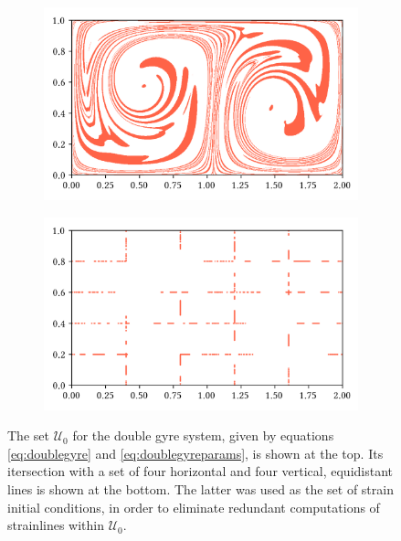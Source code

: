 \begin{figure}[htpb]
    \centering
    \begin{subfigure}{\textwidth}
        \centering
        \includegraphics{figures/domain_figures/u0_dom.png}
    \end{subfigure}

    \begin{subfigure}{\textwidth}
        \centering
        \includegraphics{figures/domain_figures/g0_dom.png}
    \end{subfigure}
    \caption[The set $\mathcal{U}_{0}$ for the double gyre system]{The set
        $\mathcal{U}_{0}$ for the double gyre system, given by equations
    \eqref{eq:doublegyre} and \eqref{eq:doublegyreparams}, is shown at the top.
    Its itersection with a set of four horizontal and four vertical, equidistant
    lines is shown at the bottom. The latter was used as the set of strain initial
    conditions, in order to eliminate redundant computations of strainlines
    within $\mathcal{U}_{0}$.}
    \label{fig:u0_domain}
\end{figure}
